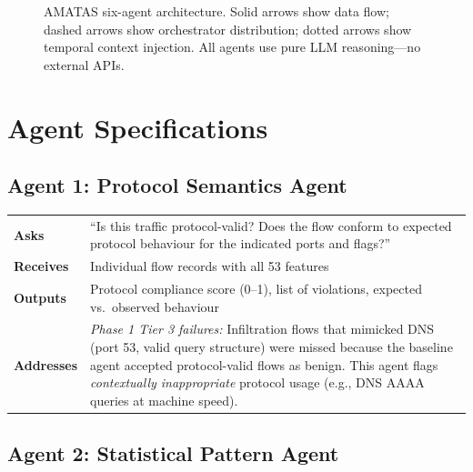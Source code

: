 \documentclass[12pt, a4paper, oneside]{report}
\begin{document}
\begin{figure}[H]
\caption{AMATAS six-agent architecture. Solid arrows show data flow;
  dashed arrows show orchestrator distribution; dotted arrows show
  temporal context injection. All agents use pure LLM reasoning---no
  external APIs.}
\label{fig:amatas}
\end{figure}


\section{Agent Specifications}

\subsection{Agent 1: Protocol Semantics Agent}

\begin{table}[H]
\centering
\begin{tabular}{@{}lp{10cm}@{}}
\toprule
\textbf{Asks}     & ``Is this traffic protocol-valid? Does the flow conform to
                     expected protocol behaviour for the indicated ports and
                     flags?'' \\
\textbf{Receives}  & Individual flow records with all 53 features \\
\textbf{Outputs}   & Protocol compliance score (0--1), list of violations,
                     expected vs.\ observed behaviour \\
\textbf{Addresses} & \emph{Phase 1 Tier 3 failures:} Infiltration flows that
                     mimicked DNS (port 53, valid query structure) were missed
                     because the baseline agent accepted protocol-valid flows
                     as benign. This agent flags \emph{contextually inappropriate}
                     protocol usage (e.g., DNS AAAA queries at machine speed). \\
\bottomrule
\end{tabular}
\end{table}

\subsection{Agent 2: Statistical Pattern Agent}
\end{document}
